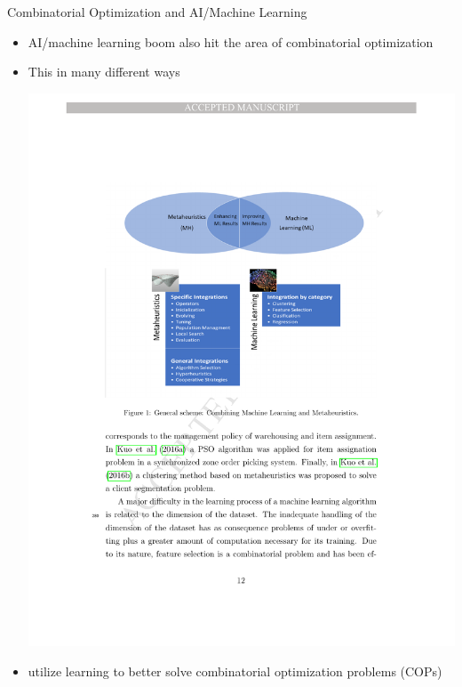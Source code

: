 \documentclass[aspectratio=1610]{beamer}
\newcommand{\important}[1]{{\color{green!60!black}#1}}
\begin{document}
	

\begin{frame}{Combinatorial Optimization and AI/Machine Learning}
	\begin{itemize}
		\itemsep2.5ex
		\item \important{AI/machine learning boom} also hit the area of \important{combinatorial optimization}
		\item This in many different ways
		\begin{center}
			\centering
			\includegraphics[width=0.85\linewidth]{graphics/mh-ml}
		\end{center}
		\item {} utilize learning to better solve \important{combinatorial optimization problems (COPs)}
	\end{itemize}
\end{frame}
\end{document}
